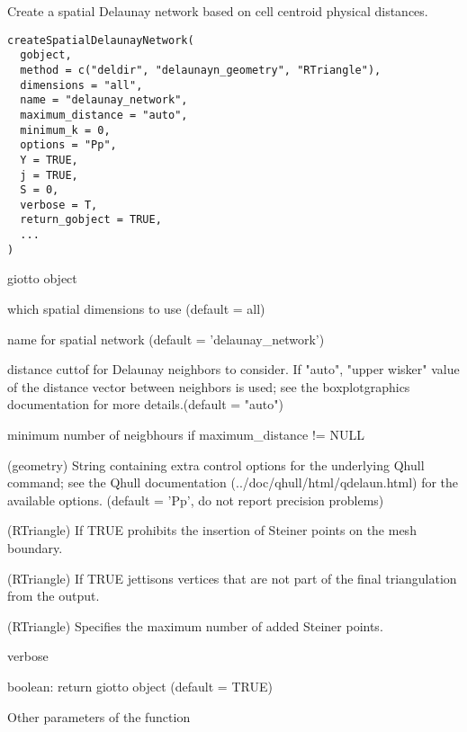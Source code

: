 \documentclass[a4paper]{book}
\begin{document}
%
\begin{Description}\relax
Create a spatial Delaunay network based on cell centroid physical distances.
\end{Description}
%
\begin{Usage}
\begin{verbatim}
createSpatialDelaunayNetwork(
  gobject,
  method = c("deldir", "delaunayn_geometry", "RTriangle"),
  dimensions = "all",
  name = "delaunay_network",
  maximum_distance = "auto",
  minimum_k = 0,
  options = "Pp",
  Y = TRUE,
  j = TRUE,
  S = 0,
  verbose = T,
  return_gobject = TRUE,
  ...
)
\end{verbatim}
\end{Usage}
%
\begin{Arguments}
\begin{ldescription}
\item[\code{gobject}] giotto object

\item[\code{dimensions}] which spatial dimensions to use (default = all)

\item[\code{name}] name for spatial network (default = 'delaunay\_network')

\item[\code{maximum\_distance}] distance cuttof for Delaunay neighbors to consider. If "auto", "upper wisker" value of the distance vector between neighbors is used; see the boxplotgraphics documentation for more details.(default = "auto")

\item[\code{minimum\_k}] minimum number of neigbhours if maximum\_distance != NULL

\item[\code{options}] (geometry) String containing extra control options for the underlying Qhull command; see the Qhull documentation (../doc/qhull/html/qdelaun.html) for the available options. (default = 'Pp', do not report precision problems)

\item[\code{Y}] (RTriangle) If TRUE prohibits the insertion of Steiner points on the mesh boundary.

\item[\code{j}] (RTriangle) If TRUE jettisons vertices that are not part of the final triangulation from the output.

\item[\code{S}] (RTriangle) Specifies the maximum number of added Steiner points.

\item[\code{verbose}] verbose

\item[\code{return\_gobject}] boolean: return giotto object (default = TRUE)

\item[\code{...}] Other parameters of the  function
\end{ldescription}
\end{Arguments}
\end{document}
